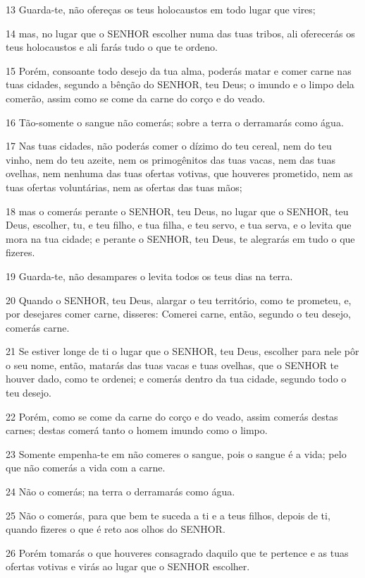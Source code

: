 \par 13 Guarda-te, não ofereças os teus holocaustos em todo lugar que vires;
\par 14 mas, no lugar que o SENHOR escolher numa das tuas tribos, ali oferecerás os teus holocaustos e ali farás tudo o que te ordeno.
\par 15 Porém, consoante todo desejo da tua alma, poderás matar e comer carne nas tuas cidades, segundo a bênção do SENHOR, teu Deus; o imundo e o limpo dela comerão, assim como se come da carne do corço e do veado.
\par 16 Tão-somente o sangue não comerás; sobre a terra o derramarás como água.
\par 17 Nas tuas cidades, não poderás comer o dízimo do teu cereal, nem do teu vinho, nem do teu azeite, nem os primogênitos das tuas vacas, nem das tuas ovelhas, nem nenhuma das tuas ofertas votivas, que houveres prometido, nem as tuas ofertas voluntárias, nem as ofertas das tuas mãos;
\par 18 mas o comerás perante o SENHOR, teu Deus, no lugar que o SENHOR, teu Deus, escolher, tu, e teu filho, e tua filha, e teu servo, e tua serva, e o levita que mora na tua cidade; e perante o SENHOR, teu Deus, te alegrarás em tudo o que fizeres.
\par 19 Guarda-te, não desampares o levita todos os teus dias na terra.
\par 20 Quando o SENHOR, teu Deus, alargar o teu território, como te prometeu, e, por desejares comer carne, disseres: Comerei carne, então, segundo o teu desejo, comerás carne.
\par 21 Se estiver longe de ti o lugar que o SENHOR, teu Deus, escolher para nele pôr o seu nome, então, matarás das tuas vacas e tuas ovelhas, que o SENHOR te houver dado, como te ordenei; e comerás dentro da tua cidade, segundo todo o teu desejo.
\par 22 Porém, como se come da carne do corço e do veado, assim comerás destas carnes; destas comerá tanto o homem imundo como o limpo.
\par 23 Somente empenha-te em não comeres o sangue, pois o sangue é a vida; pelo que não comerás a vida com a carne.
\par 24 Não o comerás; na terra o derramarás como água.
\par 25 Não o comerás, para que bem te suceda a ti e a teus filhos, depois de ti, quando fizeres o que é reto aos olhos do SENHOR.
\par 26 Porém tomarás o que houveres consagrado daquilo que te pertence e as tuas ofertas votivas e virás ao lugar que o SENHOR escolher.

